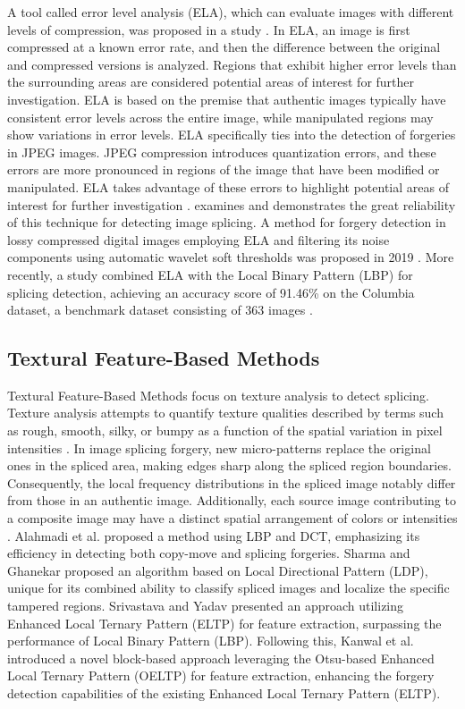 A tool called error level analysis (ELA), which can evaluate images with different levels of compression, was proposed in a study \cite{krawetz2007picture}. In ELA, an image is first compressed at a known error rate, and then the difference between the original and compressed versions is analyzed. Regions that exhibit higher error levels than the surrounding areas are considered potential areas of interest for further investigation. ELA is based on the premise that authentic images typically have consistent error levels across the entire image, while manipulated regions may show variations in error levels. ELA specifically ties into the detection of forgeries in JPEG images. JPEG compression introduces quantization errors, and these errors are more pronounced in regions of the image that have been modified or manipulated. ELA takes advantage of these errors to highlight potential areas of interest for further investigation \cite{gunawan2017development}. \cite{Jeronymo2017} examines and demonstrates the great reliability of this technique for detecting image splicing. A method for forgery detection in lossy compressed digital images employing ELA and filtering its noise components using automatic wavelet soft thresholds was proposed in 2019 \cite{ramadhani2019}. More recently, a study combined ELA with the Local Binary Pattern (LBP) for splicing detection, achieving an accuracy score of 91.46\% on the Columbia dataset, a benchmark dataset consisting of 363 images \cite{zhang2021image}.


\subsection{Textural Feature-Based Methods}\label{sec:ss2}

Textural Feature-Based Methods focus on texture analysis to detect splicing. Texture analysis attempts to quantify texture qualities described by terms such as rough, smooth, silky, or bumpy as a function of the spatial variation in pixel intensities \cite{haralick1973textural}. In image splicing forgery, new micro-patterns replace the original ones in the spliced area, making edges sharp along the spliced region boundaries. Consequently, the local frequency distributions in the spliced image notably differ from those in an authentic image. Additionally, each source image contributing to a composite image may have a distinct spatial arrangement of colors or intensities \cite{asghar2019edge}. Alahmadi et al. \cite{alahmadi2017passive} proposed a method using LBP and DCT, emphasizing its efficiency in detecting both copy-move and splicing forgeries. Sharma and Ghanekar \cite{Sharma2019} proposed an algorithm based on Local Directional Pattern (LDP), unique for its combined ability to classify spliced images and localize the specific tampered regions. Srivastava and Yadav \cite{Srivastava2020} presented an approach utilizing Enhanced Local Ternary Pattern (ELTP) for feature extraction, surpassing the performance of Local Binary Pattern (LBP). Following this, Kanwal et al. \cite{kanwal2020digital} introduced a novel block-based approach leveraging the Otsu-based Enhanced Local Ternary Pattern (OELTP) for feature extraction, enhancing the forgery detection capabilities of the existing Enhanced Local Ternary Pattern (ELTP).


